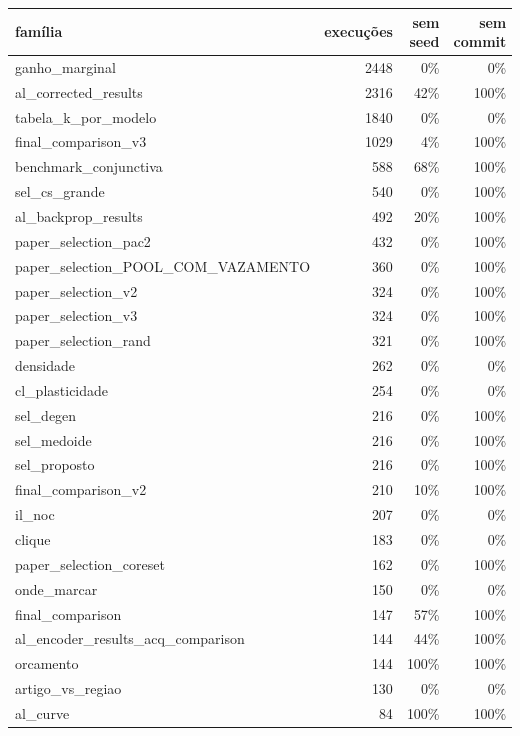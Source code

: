 \begin{tabular}{lrrr}
\toprule
família & execuções & sem seed & sem commit \\
\midrule
ganho\_marginal & 2448 & 0\% & 0\% \\
al\_corrected\_results & 2316 & 42\% & 100\% \\
tabela\_k\_por\_modelo & 1840 & 0\% & 0\% \\
final\_comparison\_v3 & 1029 & 4\% & 100\% \\
benchmark\_conjunctiva & 588 & 68\% & 100\% \\
sel\_cs\_grande & 540 & 0\% & 100\% \\
al\_backprop\_results & 492 & 20\% & 100\% \\
paper\_selection\_pac2 & 432 & 0\% & 100\% \\
paper\_selection\_POOL\_COM\_VAZAMENTO & 360 & 0\% & 100\% \\
paper\_selection\_v2 & 324 & 0\% & 100\% \\
paper\_selection\_v3 & 324 & 0\% & 100\% \\
paper\_selection\_rand & 321 & 0\% & 100\% \\
densidade & 262 & 0\% & 0\% \\
cl\_plasticidade & 254 & 0\% & 0\% \\
sel\_degen & 216 & 0\% & 100\% \\
sel\_medoide & 216 & 0\% & 100\% \\
sel\_proposto & 216 & 0\% & 100\% \\
final\_comparison\_v2 & 210 & 10\% & 100\% \\
il\_noc & 207 & 0\% & 0\% \\
clique & 183 & 0\% & 0\% \\
paper\_selection\_coreset & 162 & 0\% & 100\% \\
onde\_marcar & 150 & 0\% & 0\% \\
final\_comparison & 147 & 57\% & 100\% \\
al\_encoder\_results\_acq\_comparison & 144 & 44\% & 100\% \\
orcamento & 144 & 100\% & 100\% \\
artigo\_vs\_regiao & 130 & 0\% & 0\% \\
al\_curve & 84 & 100\% & 100\% \\

\end{tabular}
